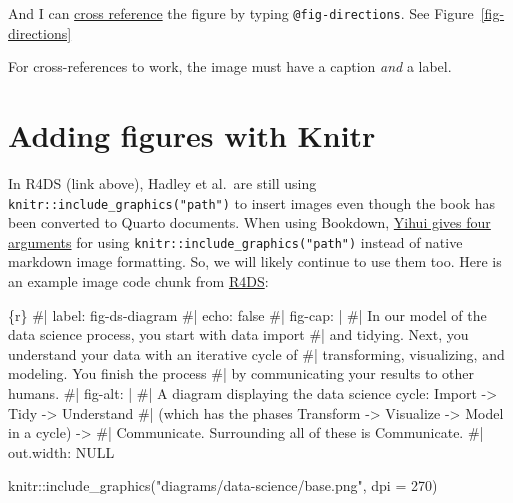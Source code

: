 \documentclass[
  letterpaper,
  DIV=11,
  numbers=noendperiod]{scrreprt}
\newenvironment{Shaded}{\begin{snugshade}}{\end{snugshade}}
\newcommand{\InformationTok}[1]{\textcolor[rgb]{0.37,0.37,0.37}{#1}}
\begin{document}
And I can
\href{https://quarto.org/docs/authoring/cross-references.html}{cross
reference} the figure by typing \texttt{@fig-directions}. See
Figure~\ref{fig-directions}

\begin{tcolorbox}[enhanced jigsaw, breakable, title=\textcolor{quarto-callout-important-color}{\faExclamation}\hspace{0.5em}{Important}, bottomrule=.15mm, coltitle=black, left=2mm, colbacktitle=quarto-callout-important-color!10!white, colback=white, toprule=.15mm, leftrule=.75mm, arc=.35mm, colframe=quarto-callout-important-color-frame, bottomtitle=1mm, toptitle=1mm, opacityback=0, titlerule=0mm, opacitybacktitle=0.6, rightrule=.15mm]

For cross-references to work, the image must have a caption \emph{and} a
label.

\end{tcolorbox}

\section{Adding figures with Knitr}\label{adding-figures-with-knitr}

In R4DS (link above), Hadley et al.~are still using
\texttt{knitr::include\_graphics("path")} to insert images even though
the book has been converted to Quarto documents. When using Bookdown,
\href{https://bookdown.org/yihui/bookdown/figures.html}{Yihui gives four
arguments} for using \texttt{knitr::include\_graphics("path")} instead
of native markdown image formatting. So, we will likely continue to use
them too. Here is an example image code chunk from
\href{https://github.com/hadley/r4ds/blob/main/intro.qmd}{R4DS}:

\begin{Shaded}
\begin{Highlighting}[]
\InformationTok{\textasciigrave{}\textasciigrave{}\textasciigrave{}\{r\}}
\InformationTok{\#| label: fig{-}ds{-}diagram}
\InformationTok{\#| echo: false}
\InformationTok{\#| fig{-}cap: |}
\InformationTok{\#|   In our model of the data science process, you start with data import}
\InformationTok{\#|   and tidying. Next, you understand your data with an iterative cycle of}
\InformationTok{\#|   transforming, visualizing, and modeling. You finish the process }
\InformationTok{\#|   by communicating your results to other humans.}
\InformationTok{\#| fig{-}alt: |}
\InformationTok{\#|   A diagram displaying the data science cycle: Import {-}\textgreater{} Tidy {-}\textgreater{} Understand }
\InformationTok{\#|   (which has the phases Transform {-}\textgreater{} Visualize {-}\textgreater{} Model in a cycle) {-}\textgreater{} }
\InformationTok{\#|   Communicate. Surrounding all of these is Communicate.}
\InformationTok{\#| out.width: NULL}

\InformationTok{knitr::include\_graphics("diagrams/data{-}science/base.png", dpi = 270)}
\InformationTok{\textasciigrave{}\textasciigrave{}\textasciigrave{}}
\end{Highlighting}
\end{Shaded}
\end{document}
